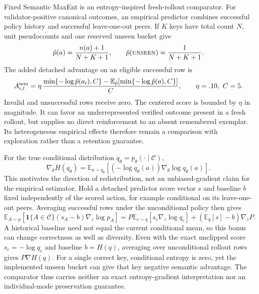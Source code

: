 \documentclass{article}
\newcommand{\1}{\mathbf 1}
\newcommand{\E}{\mathbb E}
\theoremstyle{remark}
\theoremstyle{definition}
\theoremstyle{plain}
\begin{document}
Fixed Semantic MaxEnt is an entropy-inspired fresh-rollout comparator.
For validator-positive canonical outcomes, an empirical predictor combines
successful policy history and successful leave-one-out peers. If $K$ keys
have total count $N$, unit pseudocounts and one reserved unseen bucket give
\begin{equation}
  \hat p(a)=\frac{n(a)+1}{N+K+1},\qquad
  \hat p(\textsc{unseen})=\frac{1}{N+K+1}.
  \label{eq:open-set-predictor}
\end{equation}
The added detached advantage on an eligible successful row is
\begin{equation}
  A^{\rm sem}_{i,t}=\eta\,
  \frac{\min\{-\log\hat p(a_i),C\}
    -\E_{\hat p}[\min\{-\log\hat p(a),C\}]}{C},
  \qquad \eta=.10,\ C=5.
  \label{eq:legacy-semantic-advantage}
\end{equation}
\label{app:legacy-semantic-estimator}
\label{app:semantic-estimator}
Invalid and unsuccessful rows receive zero. The centered score is bounded
by $\eta$ in magnitude. It can favor an underrepresented verified outcome
present in a fresh rollout, but supplies no direct reinforcement to an
absent remembered exemplar. Its heterogeneous empirical effects therefore
remain a comparison with exploration rather than a retention guarantee.

For the true conditional distribution $q_\theta=p_\theta(\cdot\mid\mathcal C)$,
\begin{equation}
 \nabla_\theta H(q_\theta)
 =\E_{a\sim q_\theta}[(-\log q_\theta(a))\nabla_\theta\log q_\theta(a)].
 \label{eq:entropy-score-function}
\end{equation}
This motivates the direction of redistribution, not an unbiased-gradient
claim for the empirical estimator. Hold a detached predictor score vector
$s$ and baseline $b$ fixed independently of the scored action, for example
conditional on its leave-one-out peers. Averaging successful rows under the
unconditional policy then gives
\[
 \E_{A\sim p}[\1\{A\in\mathcal C\}(s_A-b)\nabla_z\log p_A]
 =P\E_{c\sim q}[s_c\nabla_z\log q_c]
   +(\E_q[s]-b)\nabla_zP.
\]
A historical baseline need not equal the current conditional mean, so this
bonus can change correctness as well as diversity. Even with the exact
unclipped score $s_c=-\log q_c$ and baseline $b=H(q)$, averaging over
unconditional rollout rows gives $P\nabla H(q)$.
For a single correct key, conditional entropy is zero, yet the implemented
unseen bucket can give that key negative semantic advantage. The comparator
thus carries neither an exact entropy-gradient interpretation nor an
individual-mode preservation guarantee.
\end{document}
